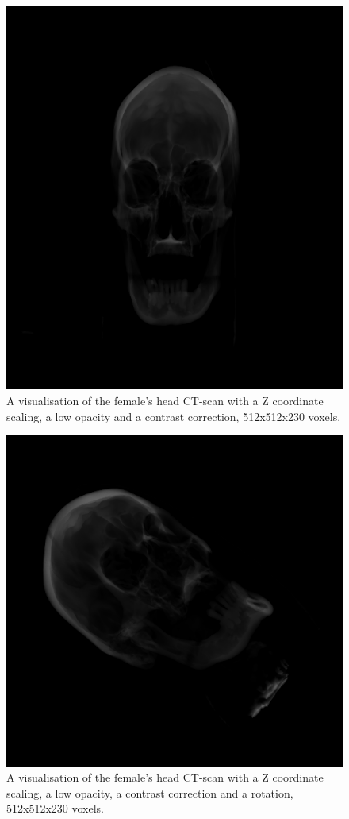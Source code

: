 \documentclass[twoside, english, 11pt]{report}
\begin{document}
\begin{figure}[H]
\centerline{\includegraphics[scale = 0.5]{img/head-op}}
\caption{A visualisation of the female's head CT-scan with a Z coordinate scaling, a low opacity and a contrast correction, 512x512x230 voxels.\label{fig:head-op}}
\end{figure}

\begin{figure}[H]
\centerline{\includegraphics[scale = 0.5]{img/head-op-rot}}
\caption{A visualisation of the female's head CT-scan with a Z coordinate scaling, a low opacity, a contrast correction and a rotation, 512x512x230 voxels.\label{fig:head-op-rot}}
\end{figure}
\end{document}
